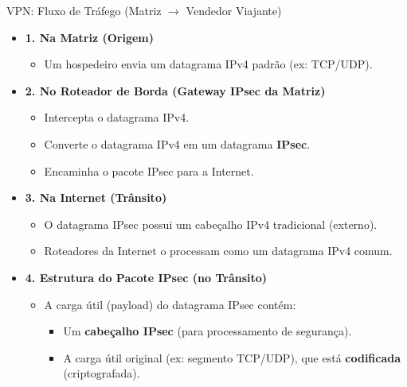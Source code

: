 \begin{frame}{VPN: Fluxo de Tráfego (Matriz $\rightarrow$ Vendedor Viajante)}
    \begin{itemize}
        \item \textbf{1. Na Matriz (Origem)}
              \begin{itemize}
                  \item Um hospedeiro envia um datagrama IPv4 padrão (ex: TCP/UDP).
              \end{itemize}

        \item \textbf{2. No Roteador de Borda (Gateway IPsec da Matriz)}
              \begin{itemize}
                  \item Intercepta o datagrama IPv4.
                  \item Converte o datagrama IPv4 em um datagrama \textbf{IPsec}.
                  \item Encaminha o pacote IPsec para a Internet.
              \end{itemize}

        \item \textbf{3. Na Internet (Trânsito)}
              \begin{itemize}
                  \item O datagrama IPsec possui um cabeçalho IPv4 tradicional (externo).
                  \item Roteadores da Internet o processam como um datagrama IPv4 comum.
              \end{itemize}

        \item \textbf{4. Estrutura do Pacote IPsec (no Trânsito)}
              \begin{itemize}
                  \item A carga útil (payload) do datagrama IPsec contém:
                        \begin{itemize}
                            \item Um \textbf{cabeçalho IPsec} (para processamento de segurança).
                            \item A carga útil original (ex: segmento TCP/UDP), que está \textbf{codificada} (criptografada).
                        \end{itemize}
              \end{itemize}


\end{itemize}
\end{frame}
